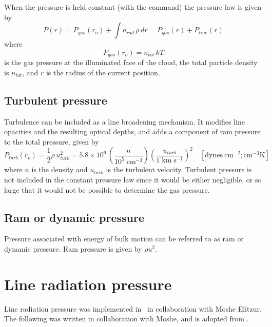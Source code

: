 When the pressure is held constant (with the  command)
the pressure law is given by
\begin{equation}
P(r) = {P_{gas}}({r_o}) + \int {{a_{rad}}\,\rho \,dr}  = {P_{gas}}(r)
+ {P_{line}}(r)
\end{equation}
where
\begin{equation}
{P_{gas}}({r_o}) = {n_{tot}}\,kT
\end{equation}
is the gas pressure at the illuminated face of the cloud, the total particle
density is $n_{tot}$, and $r$ is the radius of the current position.

\subsection{Turbulent pressure}

Turbulence can be included as a line broadening mechanism. It modifies
line opacities and the resulting optical depths, and adds a component of
ram pressure to the total pressure, given by
\begin{equation}
{P_{turb}}({r_o}) = \frac{1}{2}\rho \,u_{turb}^2 = 5.8 \times
{10^6}\,\left( {\frac{n}{{{{10}^5}\;{\mathrm{c}}{{\mathrm{m}}^{ - 3}}}}}
\right){\left( {\frac{{{u_{turb}}}}{{1\;{\mathrm{km}}\;{{\mathrm{s}}^{ - 1}}}}}
\right)^2}
\quad [\mathrm{dynes~ cm}^{-2}; \mathrm{cm}^{-3} \mathrm{K}]
\end{equation}
where $n$ is the density and $u_{turb}$ is the turbulent velocity.  Turbulent
pressure is not included in the constant pressure law since it would be
either negligible, or so large that it would not be possible to determine
the gas pressure.

\subsection{Ram or dynamic pressure}

Pressure associated with energy of bulk motion can be referred to as
ram or dynamic pressure.  Ram pressure is given by $\rho u^2$.

\section{Line radiation pressure}

Line radiation pressure was implemented in \Cloudy\ in collaboration with
Moshe Elitzur.  The following was written in collaboration with Moshe, and
is adopted from \citet{Elitzur1986}.

